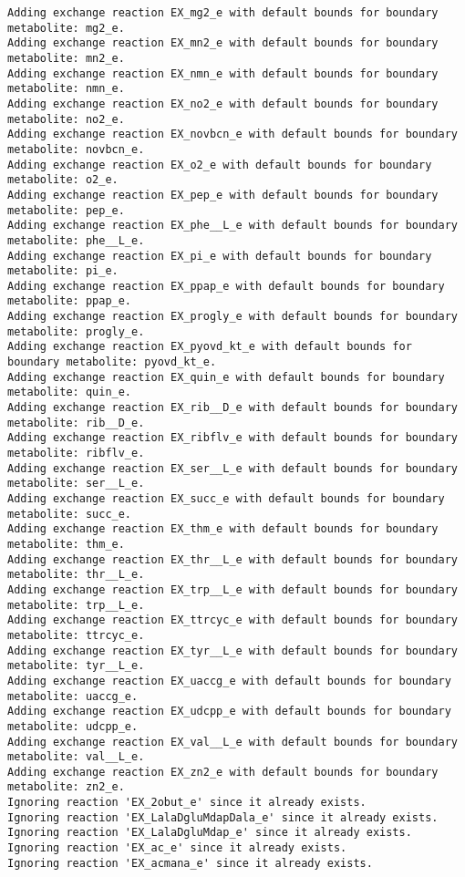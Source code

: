 \documentclass[
  letterpaper,
  DIV=11,
  numbers=noendperiod]{scrartcl}
\begin{document}
\begin{verbatim}
Adding exchange reaction EX_mg2_e with default bounds for boundary metabolite: mg2_e.
Adding exchange reaction EX_mn2_e with default bounds for boundary metabolite: mn2_e.
Adding exchange reaction EX_nmn_e with default bounds for boundary metabolite: nmn_e.
Adding exchange reaction EX_no2_e with default bounds for boundary metabolite: no2_e.
Adding exchange reaction EX_novbcn_e with default bounds for boundary metabolite: novbcn_e.
Adding exchange reaction EX_o2_e with default bounds for boundary metabolite: o2_e.
Adding exchange reaction EX_pep_e with default bounds for boundary metabolite: pep_e.
Adding exchange reaction EX_phe__L_e with default bounds for boundary metabolite: phe__L_e.
Adding exchange reaction EX_pi_e with default bounds for boundary metabolite: pi_e.
Adding exchange reaction EX_ppap_e with default bounds for boundary metabolite: ppap_e.
Adding exchange reaction EX_progly_e with default bounds for boundary metabolite: progly_e.
Adding exchange reaction EX_pyovd_kt_e with default bounds for boundary metabolite: pyovd_kt_e.
Adding exchange reaction EX_quin_e with default bounds for boundary metabolite: quin_e.
Adding exchange reaction EX_rib__D_e with default bounds for boundary metabolite: rib__D_e.
Adding exchange reaction EX_ribflv_e with default bounds for boundary metabolite: ribflv_e.
Adding exchange reaction EX_ser__L_e with default bounds for boundary metabolite: ser__L_e.
Adding exchange reaction EX_succ_e with default bounds for boundary metabolite: succ_e.
Adding exchange reaction EX_thm_e with default bounds for boundary metabolite: thm_e.
Adding exchange reaction EX_thr__L_e with default bounds for boundary metabolite: thr__L_e.
Adding exchange reaction EX_trp__L_e with default bounds for boundary metabolite: trp__L_e.
Adding exchange reaction EX_ttrcyc_e with default bounds for boundary metabolite: ttrcyc_e.
Adding exchange reaction EX_tyr__L_e with default bounds for boundary metabolite: tyr__L_e.
Adding exchange reaction EX_uaccg_e with default bounds for boundary metabolite: uaccg_e.
Adding exchange reaction EX_udcpp_e with default bounds for boundary metabolite: udcpp_e.
Adding exchange reaction EX_val__L_e with default bounds for boundary metabolite: val__L_e.
Adding exchange reaction EX_zn2_e with default bounds for boundary metabolite: zn2_e.
Ignoring reaction 'EX_2obut_e' since it already exists.
Ignoring reaction 'EX_LalaDgluMdapDala_e' since it already exists.
Ignoring reaction 'EX_LalaDgluMdap_e' since it already exists.
Ignoring reaction 'EX_ac_e' since it already exists.
Ignoring reaction 'EX_acmana_e' since it already exists.

\end{verbatim}
\end{document}
